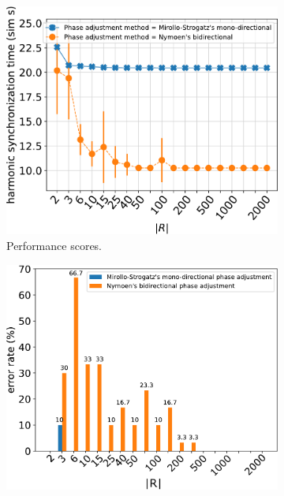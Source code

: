 		\begin{figure}[ht!]
		\begin{subfigure}[b]{0.5\textwidth}
			\centering\captionsetup{width=.9\linewidth}%
			\includegraphics[width=\textwidth]{Assets/DocSegments/Chapters/ExperimentsAndResults/Figures/PerfScores/directional_phase_adjustment_comparison_hsynchtimes.pdf}
			\caption{Performance scores.}
			\label{fig:sub:directional_phase_adjustment_comparison_hsynchtimes}
		  \end{subfigure}
		  \begin{subfigure}[b]{0.5\textwidth}
			\centering\captionsetup{width=.9\linewidth}%
			\includegraphics[width=\textwidth]{Assets/DocSegments/Chapters/ExperimentsAndResults/Figures/PerfScores/directional_phase_adjustment_comparison_errorRates.pdf}

\end{subfigure}
\end{figure}
